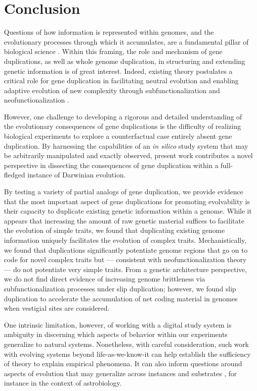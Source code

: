 \section{Conclusion} \label{sec:conclusion}

Questions of how information is represented within genomes, and the evolutionary processes through which it accumulates, are a fundamental pillar of biological science \citep{adami2024evolution}.
Within this framing, the role and mechanism of gene duplications, as well as whole genome duplication, in structuring and extending genetic information is of great interest.
Indeed, existing theory postulates a critical role for gene duplication in facilitating neutral evolution and enabling adaptive evolution of new complexity through subfunctionalization and neofunctionalization \citep{ohno1970evolution}.

However, one challenge to developing a rigorous and detailed understanding of the evolutionary consequences of gene duplications is the difficulty of realizing biological experiments to explore a counterfactual case entirely absent gene duplication.
By harnessing the capabilities of an \textit{in silico} study system that may be arbitrarily manipulated and exactly observed, present work contributes a novel perspective in dissecting the consequences of gene duplication within a full-fledged instance of Darwinian evolution.

By testing a variety of partial analogs of gene duplication, we provide evidence that the most important aspect of gene duplications for promoting evolvability is their capacity to duplicate existing genetic information within a genome.
While it appears that increasing the amount of raw genetic material suffices to facilitate the evolution of simple traits, we found that duplicating existing genome information uniquely facilitates the evolution of complex traits.
Mechanistically, we found that duplications significantly potentiate genome regions that go on to code for novel complex traits but --- consistent with neofunctionalization theory --- do not potentiate very simple traits.
From a genetic architecture perspective, we do not find direct evidence of increasing genome brittleness via subfunctionalization processes under slip duplication; however, we found slip duplication to accelerate the accumulation of net coding material in genomes when vestigial sites are considered.

One intrinsic limitation, however, of working with a digital study system is ambiguity in discerning which aspects of behavior within our experiments generalize to natural systems.
Nonetheless, with careful consideration, such work with evolving systems beyond life-as-we-know-it can help establish the sufficiency of theory to explain empirical phenomena.
It can also inform questions around aspects of evolution that may generalize across instances and substrates \citep{dorin2024what}, for instance in the context of astrobiology.

